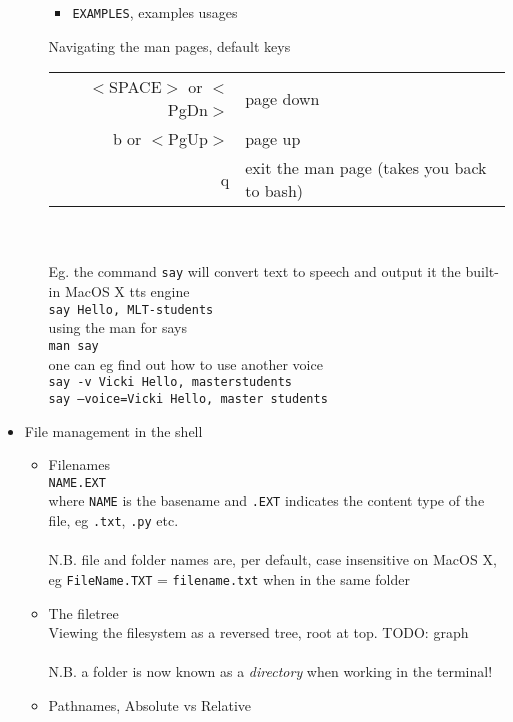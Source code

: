 \documentclass[a4,landscape]{seminar}
\begin{document}
\begin{slide}
\begin{itemize}
\begin{itemize}
\begin{itemize}
      \item \texttt{EXAMPLES}, examples usages
      \end{itemize}
      \clearpage{}
      Navigating the man pages, default keys
        \begin{tabular}{|r|l|}
          \hline
          $<$SPACE$>$ or $<$PgDn$>$ & page down\\
          b or $<$PgUp$>$ & page up\\
          q & exit the man page (takes you back to bash)\\\hline
        \end{tabular}
        \\\\
        Eg. the command \texttt{say} will convert text to speech and output it the built-in MacOS X
        tts engine\\[1ex]
        \texttt{say Hello, MLT-students}\\[1ex]
        using the man for says\\[1ex]
        \texttt{man say}\\[1ex]
        one can eg find out how to use another voice\\[1ex]
        \texttt{say -v Vicki Hello, masterstudents}\\
        \texttt{say --voice=Vicki Hello, master students}
    \end{itemize}
    \clearpage{}
  \item File management in the shell
    \begin{itemize}
    \item Filenames\\[1ex]
      \texttt{NAME.EXT}\\[1ex]
      where \texttt{NAME} is the basename and \texttt{.EXT} indicates
      the content type of the file, eg \texttt{.txt}, \texttt{.py} etc.\\\\
      N.B. file and folder names are, per default, case insensitive on MacOS X, eg \texttt{FileName.TXT} = \texttt{filename.txt} when in the same folder
    \item The filetree\\[1ex]
      Viewing the filesystem as a reversed tree, root at top. TODO: graph \\\\
      N.B. a folder is now known as a \emph{directory} when working in the terminal!
      \clearpage{}
    \item Pathnames, Absolute vs Relative\\[1ex]

\end{itemize}
\end{itemize}
\end{slide}
\end{document}
